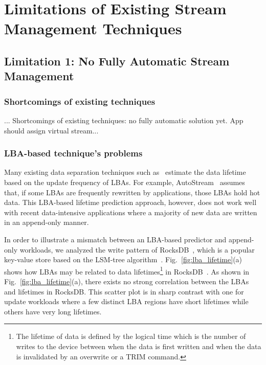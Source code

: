 \section{Limitations of Existing Stream Management Techniques}
\subsection{Limitation 1: No Fully Automatic Stream Management}

\subsubsection{Shortcomings of existing techniques}
 ... Shortcomings of existing techniques: no fully automatic solution yet.  App should assign virtual stream...


\subsubsection{LBA-based technique's problems}
Many existing data separation techniques such as~\cite{AutoStream, HotCold} 
estimate the data lifetime based on the update frequency of LBAs.  
For example, \textsf{\small AutoStream}~\cite{AutoStream} assumes that, if
some LBAs are frequently rewritten by applications, those LBAs hold hot data.
This LBA-based lifetime prediction 
approach, however, does not work well with recent data-intensive 
applications where a majority of
new data are written in an append-only manner.  

In order to illustrate a mismatch between an LBA-based predictor and 
append-only workloads, we analyzed the write pattern of 
RocksDB~\cite{RocksDB}, which is a
popular key-value store based on the LSM-tree algorithm~\cite{LSM}.
Fig.~\ref{fig:lba_lifetime}(a) shows how LBAs may be related 
to data lifetimes\footnote{The lifetime of data is defined 
by the logical time which is the number of writes to the device 
between when the data is first written 
and when the data is invalidated by an overwrite or a TRIM command.}
in RocksDB~\cite{RocksDB}.  
As shown in Fig.~\ref{fig:lba_lifetime}(a), 
there exists no strong correlation between the LBAs and lifetimes in RocksDB.  
This scatter plot is in sharp contrast with one for update workloads 
where a few distinct LBA regions have short lifetimes while others 
have very long lifetimes.

